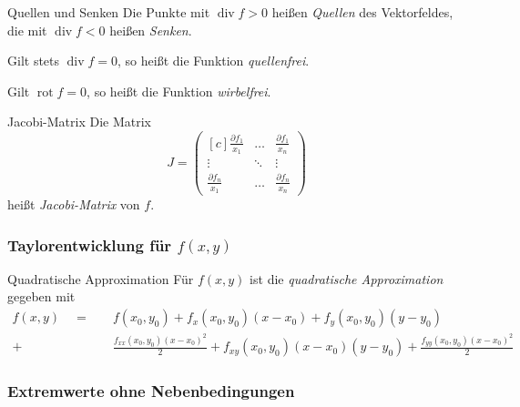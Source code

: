 \documentclass[german]{../spicker}
\newcommand{\vektor}[1]{\begin{pmatrix*}[c] #1 \end{pmatrix*}}
\begin{document}
\begin{bonus}{Quellen und Senken}
    Die Punkte mit $\operatorname{div} f > 0$ heißen \emph{Quellen} des Vektorfeldes, die mit $\operatorname{div} f < 0$ heißen \emph{Senken}.

    Gilt stets $\operatorname{div} f = 0$, so heißt die Funktion \emph{quellenfrei}.

    Gilt $\operatorname{rot} f = 0$, so heißt die Funktion \emph{wirbelfrei}.
\end{bonus}

\begin{defi}{Jacobi-Matrix}
    Die Matrix
    $$
        J = \vektor{\frac{\partial f_1}{x_1} & \ldots & \frac{\partial f_1}{x_n} \\ \vdots & \ddots & \vdots \\ \frac{\partial f_n}{x_1} & \ldots & \frac{\partial f_n}{x_n}}
    $$
    heißt \emph{Jacobi-Matrix} von $f$.
\end{defi}

\subsubsection{Taylorentwicklung für $f(x, y)$}

\begin{defi}{Quadratische Approximation}
    Für $f(x, y)$ ist die \emph{quadratische Approximation} gegeben mit
    $$
        \begin{aligned}
            f(x, y) \quad = \quad & f(x_0, y_0) + f_x(x_0, y_0) (x-x_0) + f_y(x_0, y_0) (y-y_0)                                                    \\
            + \quad               & \frac{f_{xx}(x_0, y_0) (x-x_0)^2}{2} + f_{xy}(x_0, y_0) (x-x_0) (y-y_0) + \frac{f_{yy}(x_0, y_0) (x-x_0)^2}{2}
        \end{aligned}
    $$
\end{defi}

\subsubsection{Extremwerte ohne Nebenbedingungen}
\end{document}
